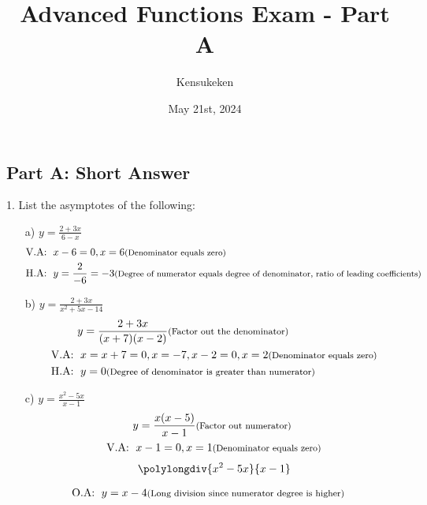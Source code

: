 \documentclass{article}
\title{Advanced Functions Exam - Part A}
\author{Kensukeken}
\date{May 21st, 2024}
\newenvironment{solution}{\color{solutioncolor}}{}
\newcommand{\smalltext}[1]{\text{\footnotesize #1}}
\begin{document}
\maketitle

\subsection*{Part A: Short Answer}
1. List the asymptotes of the following:
\begin{enumerate}
    \item[a)] \( y = \frac{2 + 3x}{6 - x} \)
    \begin{solution}
        \begin{align*}
        \text{V.A: } & \; x-6 =0, x = 6 \smalltext{ (Denominator equals zero)} \\
        \text{H.A: } & \; y = \frac{2}{-6} = -3 \smalltext{ (Degree of numerator equals degree of denominator, ratio of leading coefficients)}
    \end{align*}
\end{solution}
    \item[b)] \( y = \frac{2 + 3x}{x^2 + 5x - 14} \)
    \begin{solution}
        \begin{align*}
        &y = \frac{2 + 3x}{(x + 7)(x - 2)} \smalltext{ (Factor out the denominator)} \\
        \text{V.A: } & \; x = x + 7=0, x= -7, x-2=0, x= 2 \smalltext{ (Denominator equals zero)} \\
        \text{H.A: } & \; y = 0 \smalltext{ (Degree of denominator is greater than numerator)}
    \end{align*}
\end{solution}
    \item[c)] \( y = \frac{x^2 - 5x}{x - 1} \)
        \begin{solution}
    \begin{align*}
        &y = \frac{x(x - 5)}{x - 1} \smalltext{ (Factor out numerator)} \\
        \text{V.A: } & \; x -1 = 0, x=1 \smalltext{ (Denominator equals zero)} \\
        \end{align*}
        $$\polylongdiv{x^2-5x}{x-1}$$
    
        \begin{align*}
        \text{O.A: } & \; y = x-4 \smalltext{ (Long division since numerator degree is higher)}
    \end{align*}
    \end{solution}
\end{enumerate}
\end{document}
